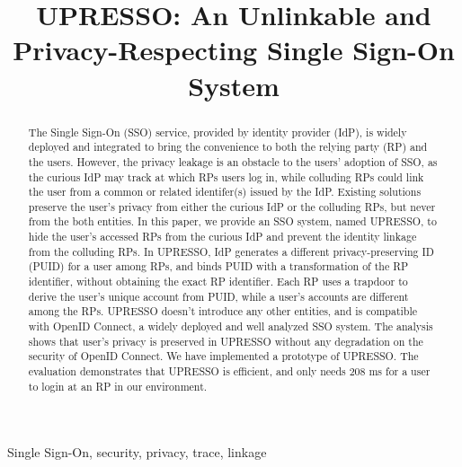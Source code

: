 \documentclass[conference, 10pt]{IEEEtran}
\begin{document}
\title{{UPRESSO}: An Unlinkable and Privacy-Respecting Single Sign-On System}
%
\maketitle
\begin{abstract}
 The Single Sign-On (SSO) service, provided by identity provider (IdP),  is widely deployed and integrated to bring the convenience to both the relying party (RP) and the users.
 However, the privacy leakage is an obstacle to the users' adoption of SSO, 
 as the curious IdP may track at which RPs users log in,
while colluding RPs could link the user from a common or related identifer(s) issued by the IdP.
 Existing solutions preserve the user's privacy  from either the curious IdP or the colluding RPs, but never from the both entities. 
In this paper, we provide an SSO system, named UPRESSO, to hide the user's accessed RPs from the curious IdP 
and prevent the identity linkage from the colluding RPs. 
In UPRESSO, IdP generates a different privacy-preserving ID (PUID) for a user among RPs, and binds PUID with a transformation of the RP identifier, without obtaining the exact RP identifier.
Each RP uses a trapdoor to derive the user's unique account from PUID, 
while a user's accounts are different among the RPs.
UPRESSO doesn't introduce any other entities, and  is compatible with OpenID Connect, a widely deployed and well analyzed SSO system. 
The analysis shows that user's privacy is preserved in UPRESSO without any degradation on the security of OpenID Connect.
We have implemented a prototype of UPRESSO. The evaluation demonstrates that UPRESSO is efficient, and only needs 208 ms for a user to login at an RP in our environment.
\end{abstract}
\begin{IEEEkeywords}
Single Sign-On, security, privacy, trace, linkage
\end{IEEEkeywords}
\end{document}
